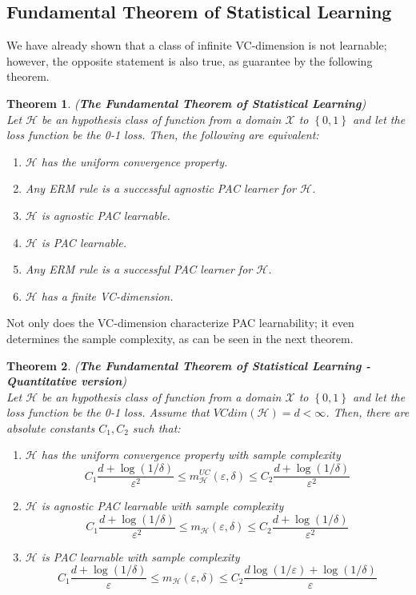\documentclass[12pt]{report}
\theoremstyle{plain}
\newtheorem{THEO}{Theorem}
\newcommand\mcl[1]{\mathcal{#1}}
\begin{document}
\begin{flushleft}
\section{Fundamental Theorem of Statistical Learning}
We have already shown that a class of infinite VC-dimension is not learnable; 
however, the opposite statement is also true, as guarantee by the following 
theorem.
\begin{THEO} (\textbf{The Fundamental Theorem of Statistical Learning})\\
	Let $\mcl{H}$ be an hypothesis class of function from a domain $\mcl{X}$ to 
	$\left\{0,1\right\}$ and let the loss function be the 0-1 loss. Then, the 
	following are equivalent:
	\begin{enumerate}
		\item $\mcl{H}$ has the uniform convergence property.
		\item Any ERM rule is a successful agnostic PAC learner for $\mcl{H}$.
		\item $\mcl{H}$ is agnostic PAC learnable.
		\item $\mcl{H}$ is PAC learnable.
		\item Any ERM rule is a successful PAC learner for $\mcl{H}$.
		\item $\mcl{H}$ has a finite VC-dimension.
	\end{enumerate}
\end{THEO} 
Not only does the VC-dimension characterize PAC learnability; it even 
determines the sample complexity, as can be seen in the next theorem.
\begin{THEO} (\textbf{The Fundamental Theorem of Statistical Learning - 
Quantitative version})\\
	Let $\mcl{H}$ be an hypothesis class of function from a domain $\mcl{X}$ to 
	$\left\{0,1\right\}$ and let the loss function be the 0-1 loss. Assume that 
	$VCdim(\mcl{H})=d<\infty$. Then, there are absolute constants $C_1,C_2$ 
	such that:
	\begin{enumerate}
		\item $\mcl{H}$ has the uniform convergence property with sample 
		complexity
		\[ C_1\frac{d+\log(1/\delta)}{\varepsilon^2}\leq 
		m_{\mcl{H}}^{UC}(\varepsilon,\delta)\leq 
		C_2\frac{d+\log(1/\delta)}{\varepsilon^2} \]
		\item $\mcl{H}$ is agnostic PAC learnable with sample complexity 
		\[ C_1\frac{d+\log(1/\delta)}{\varepsilon^2}\leq 
		m_{\mcl{H}}(\varepsilon,\delta)\leq 
		C_2\frac{d+\log(1/\delta)}{\varepsilon^2} \]
		\item $\mcl{H}$ is PAC learnable with sample complexity
		\[ C_1\frac{d+\log(1/\delta)}{\varepsilon}\leq 
		m_{\mcl{H}}(\varepsilon,\delta)\leq 
		C_2\frac{d\log(1/\varepsilon)+\log(1/\delta)}{\varepsilon} \]
	\end{enumerate}
\end{THEO}














\end{flushleft}
\end{document}
